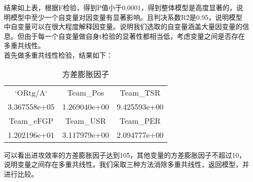 结果如上表，根据F检验，得到P值小于0.0001，得到整体模型是高度显著的，说明模型中至少一个自变量对因变量有显著影响。且判决系数R\^2是0.95，说明模型中自变量可以在很大程度解释因变量。说明我们选取的自变量涵盖大量因变量的信息。但由于每一个自变量做自身t检验的显著性都相当低，考虑变量之间是否存在多重共线性。\\

首先做多重共线性检验，结果如下：
\begin{table}[h!]
	\begin{tabular}{|c|c|c|}
		\hline
		   `ORtg/A`   &  Team\_Pos &    Team\_TSR   \\ 	
		3.367558e+05 &1.269040e+00   &9.425593e+00\\
		\hline
			   Team\_eFGP  &   Team\_USR  &   Team\_PER  \\
		 1.202196e+01 &3.117979e+00 &2.094777e+00  \\
		\hline
	\end{tabular}
\centering
\caption{方差膨胀因子}
\label{tab:8}
\end{table}

可以看出进攻效率的方差膨胀因子达到10\^5，其他变量的方差膨胀因子不超过10，说明变量之间存在多重共线性。我们采取三种方法消除多重共线性，返回模型，并进行比较。

